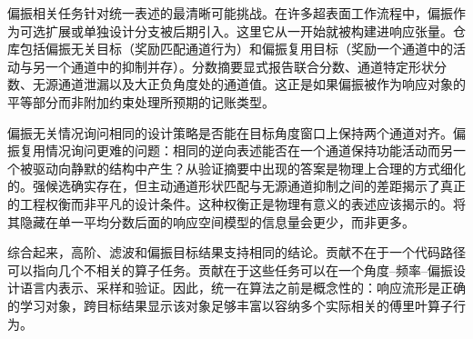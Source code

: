偏振相关任务针对统一表述的最清晰可能挑战。在许多超表面工作流程中，偏振作为可选扩展或单独设计分支被后期引入。这里它从一开始就被构建进响应张量。仓库包括偏振无关目标（奖励匹配通道行为）和偏振复用目标（奖励一个通道中的活动与另一个通道中的抑制并存）。分数摘要显式报告联合分数、通道特定形状分数、无源通道泄漏以及大正负角度处的通道值。这正是如果偏振被作为响应对象的平等部分而非附加约束处理所预期的记账类型。

偏振无关情况询问相同的设计策略是否能在目标角度窗口上保持两个通道对齐。偏振复用情况询问更难的问题：相同的逆向表述能否在一个通道保持功能活动而另一个被驱动向静默的结构中产生？从验证摘要中出现的答案是物理上合理的方式细化的。强候选确实存在，但主动通道形状匹配与无源通道抑制之间的差距揭示了真正的工程权衡而非平凡的设计条件。这种权衡正是物理有意义的表述应该揭示的。将其隐藏在单一平均分数后面的响应空间模型的信息量会更少，而非更多。

综合起来，高阶、滤波和偏振目标结果支持相同的结论。贡献不在于一个代码路径可以指向几个不相关的算子任务。贡献在于这些任务可以在一个角度--频率--偏振设计语言内表示、采样和验证。因此，统一在算法之前是概念性的：响应流形是正确的学习对象，跨目标结果显示该对象足够丰富以容纳多个实际相关的傅里叶算子行为。
